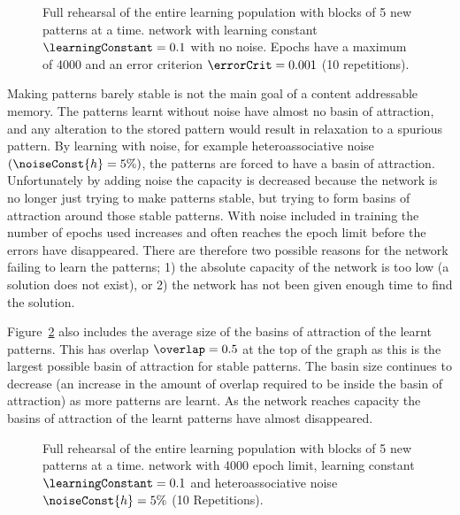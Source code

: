 \begin{figure}[tbp]
 \small
	\centering
		
	\caption{Full rehearsal of the entire learning population with blocks of 5 new patterns at a time.  network with learning constant $\learningConstant = 0.1$ with no noise. Epochs have a maximum of 4000 and an error criterion $\errorCrit = 0.001$ (10 repetitions).}
	\label{fig:realRehearsal}
\end{figure}


Making patterns barely stable is not the main goal of a content addressable memory.  The patterns learnt without noise have almost no basin of attraction, and any alteration to the stored pattern would result in relaxation to a spurious pattern.  By learning with noise, for example heteroassociative noise $(\noiseConst{h} =5\%)$, the patterns are forced to have a basin of attraction.  Unfortunately by adding noise the capacity is decreased because the network is no longer just trying to make patterns stable, but trying to form basins of attraction around those stable patterns.  With noise included in training the number of epochs used increases and often reaches the epoch limit before the errors have disappeared.  There are therefore two possible reasons for the network failing to learn the patterns; 1) the absolute capacity of the network is too low (a solution does not exist), or  2) the network has not been given enough time to find the solution.

Figure~\ref{fig:realRehearsalHetero} also includes the average size of the basins of attraction of the learnt patterns.  This has overlap $\overlap = 0.5$ at the top of the graph as this is the largest possible basin of attraction for stable patterns.  The basin size continues to decrease (an increase in the amount of overlap required to be inside the basin of attraction) as more patterns are learnt.  As the network reaches capacity the basins of attraction of the learnt patterns have almost disappeared. 


\begin{figure}[tbp]
\small
	\centering
		
	\caption{Full rehearsal of the entire learning population with blocks of 5 new patterns at a time.  network with 4000 epoch limit, learning constant $\learningConstant = 0.1$ and heteroassociative noise $\noiseConst{h} = 5\%$ (10 Repetitions).}
	\label{fig:realRehearsalHetero}
\end{figure}


